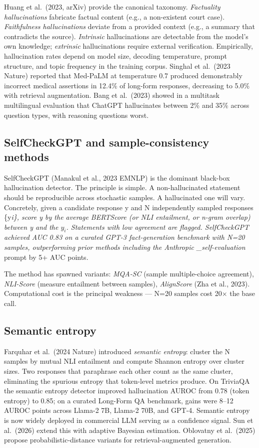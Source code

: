 \documentclass{article}
\begin{document}
Huang et al.~(2023, arXiv) provide the canonical taxonomy. \emph{Factuality hallucinations} fabricate factual content (e.g., a non-existent court case). \emph{Faithfulness hallucinations} deviate from a provided context (e.g., a summary that contradicts the source). \emph{Intrinsic} hallucinations are detectable from the model's own knowledge; \emph{extrinsic} hallucinations require external verification. Empirically, hallucination rates depend on model size, decoding temperature, prompt structure, and topic frequency in the training corpus. Singhal et al.~(2023 Nature) reported that Med-PaLM at temperature 0.7 produced demonstrably incorrect medical assertions in 12.4\% of long-form responses, decreasing to 5.0\% with retrieval augmentation. Bang et al.~(2023) showed in a multitask multilingual evaluation that ChatGPT hallucinates between 2\% and 35\% across question types, with reasoning questions worst.

\subsection{SelfCheckGPT and sample-consistency methods}\label{selfcheckgpt-and-sample-consistency-methods}

SelfCheckGPT (Manakul et al., 2023 EMNLP) is the dominant black-box hallucination detector. The principle is simple. A non-hallucinated statement should be reproducible across stochastic samples. A hallucinated one will vary. Concretely, given a candidate response y and N independently sampled responses \{y\emph{i\}, score y by the average BERTScore (or NLI entailment, or n-gram overlap) between y and the \(y_i\). Statements with low agreement are flagged. SelfCheckGPT achieved AUC 0.83 on a curated GPT-3 fact-generation benchmark with N=20 samples, outperforming prior methods including the Anthropic \_self-evaluation} prompt by 5+ AUC points.

The method has spawned variants: \emph{MQA-SC} (sample multiple-choice agreement), \emph{NLI-Score} (measure entailment between samples), \emph{AlignScore} (Zha et al., 2023). Computational cost is the principal weakness --- N=20 samples cost 20× the base call.

\subsection{Semantic entropy}\label{semantic-entropy}

Farquhar et al.~(2024 Nature) introduced \emph{semantic entropy}: cluster the N samples by mutual NLI entailment and compute Shannon entropy over cluster sizes. Two responses that paraphrase each other count as the same cluster, eliminating the spurious entropy that token-level metrics produce. On TriviaQA the semantic entropy detector improved hallucination AUROC from 0.78 (token entropy) to 0.85; on a curated Long-Form QA benchmark, gains were 8--12 AUROC points across Llama-2 7B, Llama-2 70B, and GPT-4. Semantic entropy is now widely deployed in commercial LLM serving as a confidence signal. Sun et al.~(2026) extend this with adaptive Bayesian estimation. Oblovatny et al.~(2025) propose probabilistic-distance variants for retrieval-augmented generation.
\end{document}
